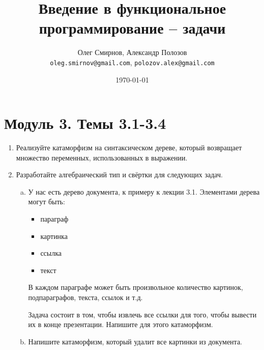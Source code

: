 \documentclass[a4paper,11pt]{article}
\author{Олег Смирнов, Александр Полозов \\
\texttt{oleg.smirnov@gmail.com}, \texttt{polozov.alex@gmail.com}}
\date{\today}
\title{Введение в функциональное программирование -- задачи}
\begin{document}
\section*{Модуль 3. Темы 3.1-3.4}
\begin{enumerate}[{1-}1]

\item Реализуйте катаморфизм на синтаксическом дереве, который возвращает
  множество переменных, использованных в выражении.
\item Разработайте алгебраический тип и свёртки для следующих задач.

  \begin{enumerate}[(a)]
  \item У нас есть дерево документа, к примеру к лекции 3.1.
  Элементами дерева могут быть:

  \begin{itemize}
  \item параграф
  \item картинка
  \item ссылка
  \item текст
  \end{itemize}
  В каждом параграфе может быть произвольное количество картинок,
  подпараграфов, текста, ссылок и т.д.

  Задача состоит в том, чтобы извлечь все ссылки для того, чтобы вывести
  их в конце презентации. Напишите для этого катаморфизм.

  \item Напишите катаморфизм, который удалит все картинки из документа.
  \end{enumerate}
\end{enumerate}
\end{document}
